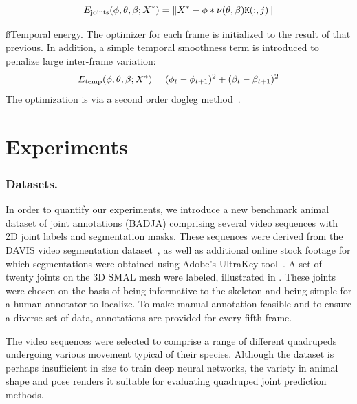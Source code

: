 \begin{equation}
{E_{\text{joints}}}(\phi, \theta, \beta; X^{*}) = 
\lVert X^{*} - \phi * \nu(\theta,\beta)\mathtt{K}(:,j) \rVert
\end{equation}

\ss{Temporal energy.}
The optimizer for each frame is initialized to the result of that previous. In addition, a simple temporal smoothness term is introduced to penalize large inter-frame variation:
\begin{equation}
{E_{\text{temp}}}(\phi, \theta, \beta; X^{*}) = (\phi_t - \phi_{t+1})^2 + (\beta_t - \beta_{t+1})^2
\end{equation}
The optimization is via a second order dogleg method~\cite{lourakis2005levenberg}.

\section{Experiments}
\subsubsection*{Datasets.}
In order to quantify our experiments, we introduce a new benchmark animal dataset of joint annotations (BADJA) comprising several video sequences with 2D joint labels and segmentation masks.
These sequences were derived from the DAVIS video segmentation dataset~\cite{Perazzi2016}, as well as additional online stock footage for which segmentations were obtained using Adobe's UltraKey tool~\cite{adobe_ultrakey}. A set of twenty joints on the 3D SMAL mesh were labeled, illustrated in . These joints were chosen on the basis of being informative to the skeleton and being simple for a human annotator to localize. To make manual annotation feasible and to ensure a diverse set of data, annotations are provided for every fifth frame. 

The video sequences were selected to comprise a range of different quadrupeds undergoing various movement typical of their species. Although the dataset is perhaps insufficient in size to train deep neural networks, the variety in animal shape and pose renders it suitable for evaluating quadruped joint prediction methods. 


